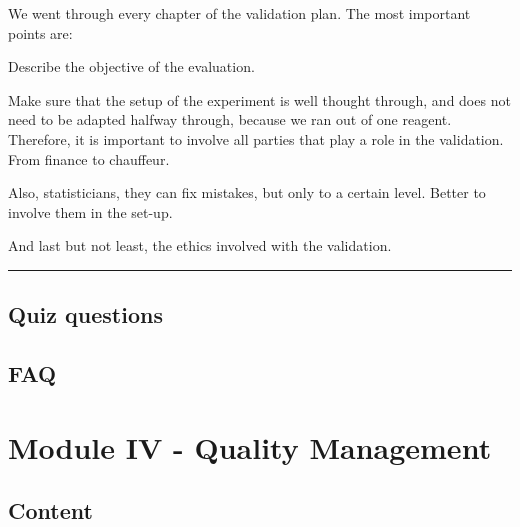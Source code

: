\documentclass[
]{book}
\begin{document}
We went through every chapter of the validation plan. The most important
points are:

Describe the objective of the evaluation.

Make sure that the setup of the experiment is well thought through, and
does not need to be adapted halfway through, because we ran out of one
reagent. Therefore, it is important to involve all parties that play a
role in the validation. From finance to chauffeur.

Also, statisticians, they can fix mistakes, but only to a certain level.
Better to involve them in the set-up.

And last but not least, the ethics involved with the validation.

\begin{center}\rule{0.5\linewidth}{0.5pt}\end{center}

\hypertarget{quiz-questions-1}{%
\subsection{Quiz questions}\label{quiz-questions-1}}

\hypertarget{faq-1}{%
\subsection{FAQ}\label{faq-1}}

\hypertarget{module-iv---quality-management}{%
\section{Module IV - Quality Management}\label{module-iv---quality-management}}

\hypertarget{content-2}{%
\subsection{Content}\label{content-2}}
\end{document}
